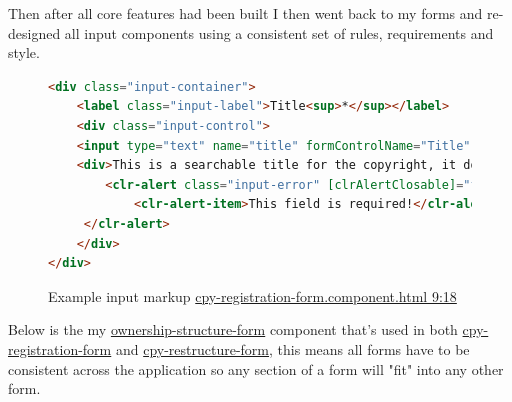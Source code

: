 Then after all core features had been built I then went back to my forms and re-designed all input components using a consistent set of rules, requirements and style.    

\begin{figure}[H]
\caption{Example input markup \href{https://github.com/MrHarrisonBarker/CRPL/blob/main/CRPL.Web/ClientApp/src/app/Forms/cpy-registration-form/cpy-registration-form.component.html}{cpy-registration-form.component.html 9:18}}
\centering
\begin{lstlisting}[language=html]
<div class="input-container">
	<label class="input-label">Title<sup>*</sup></label>
	<div class="input-control">
	<input type="text" name="title" formControlName="Title" placeholder="Hello world"/>
	<div>This is a searchable title for the copyright, it doesn't have to be unique only descriptive and relevant&nbsp;<sup>*saved to the blockchain</sup></div>
		<clr-alert class="input-error" [clrAlertClosable]="false" clrAlertType="danger" *ngIf="InvalidAndUntouched('Title')">
		 	<clr-alert-item>This field is required!</clr-alert-item>
	 </clr-alert>
	</div>
</div>
\end{lstlisting}
\end{figure}

Below is the my \href{https://github.com/MrHarrisonBarker/CRPL/tree/main/CRPL.Web/ClientApp/src/app/Forms/ownership-structure-form}{ownership-structure-form} component that's used in both \href{https://github.com/MrHarrisonBarker/CRPL/tree/main/CRPL.Web/ClientApp/src/app/Forms/cpy-registration-form}{cpy-registration-form} and \href{https://github.com/MrHarrisonBarker/CRPL/tree/main/CRPL.Web/ClientApp/src/app/Forms/cpy-restructure-form}{cpy-restructure-form}, this means all forms have to be consistent across the application so any section of a form will "fit" into any other form.

